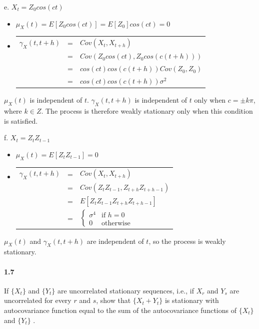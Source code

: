 \documentclass[]{article}
\let\oldparagraph\paragraph
\renewcommand{\paragraph}[1]{\oldparagraph{#1}\mbox{}}
\begin{document}
e. $X_t = Z_0 cos(ct)$

\color{blue}
\begin{itemize}
\item $\mu_X(t) = E[Z_0 cos(ct)]
                = E[Z_0] cos(ct)
                = 0$
\item 
\begin{tabular}{ccl}
$\gamma_X(t, t+h)$ & = & $Cov(X_t, X_{t+h})$\\
                  & = & $Cov(Z_0 cos(ct), Z_0 cos(c(t+h)))$\\
                  & = & $cos(ct) cos(c(t+h)) Cov(Z_0, Z_0)$\\
                  & = & $cos(ct) cos(c(t+h)) \sigma^2$\\
\end{tabular}
\end{itemize}
$\mu_X(t)$ is independent of $t$. $\gamma_X(t, t+h)$ is independent of $t$ only when $c = \pm k\pi$, where $k \in Z$. The process is therefore weakly stationary only when this condition is satisfied.
\color{black}

f. $X_t = Z_t Z_{t-1}$

\color{blue}
\begin{itemize}
\item $\mu_X(t) = E[Z_t Z_{t-1}]
                = 0$
\item 
\begin{tabular}{ccl}
$\gamma_X(t, t+h)$ & = & $Cov(X_t, X_{t+h})$\\
                  & = & $Cov(Z_t Z_{t-1}, Z_{t+h} Z_{t+h-1})$\\
                  & = & $E[Z_t Z_{t-1} Z_{t+h} Z_{t+h-1}]$\\
                  & = & $\begin{cases} \sigma^4 & \mbox{if } h=0\\ 0 & \mbox{otherwise} \end{cases}$\\
\end{tabular}
\end{itemize}
$\mu_X(t)$ and $\gamma_X(t, t+h)$ are independent of $t$, so the process is weakly stationary.
\color{black}


\paragraph{1.7}
If $\{X_t\}$ and $\{Y_t\}$ are uncorrelated stationary sequences, i.e., if $X_r$ and $Y_s$ are uncorrelated for every $r$ and $s$, show that $\{X_t + Y_t\}$ is stationary with autocovariance function equal to the sum of the autocovariance functions of $\{X_t\}$ and $\{Y_t\}$ .
\end{document}
